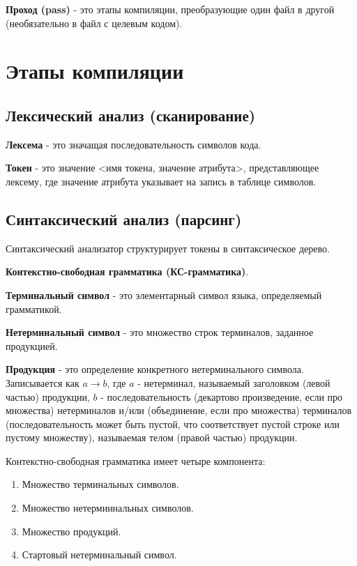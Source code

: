 \documentclass[oneside]{book}
\begin{document}
    \textbf{Проход (pass)} - это этапы компиляции,
    преобразующие один файл в другой
    (необязательно в файл с целевым кодом).
    
    \section{Этапы компиляции}
    \subsection{Лексический анализ (сканирование)}
    \textbf{Лексема} - это значащая последовательность символов кода.
    
    \textbf{Токен} - это значение <имя токена, значение атрибута>,
    представляющее лексему, где значение атрибута
    указывает на запись в таблице символов.

    \subsection{Синтаксический анализ (парсинг)}
    Синтаксический анализатор структурирует токены в синтаксическое дерево.

    \textbf{Контекстно-свободная грамматика (КС-грамматика)}.

    \textbf{Терминальный символ} - это элементарный символ языка,
    определяемый грамматикой.

    \textbf{Нетерминальный символ} - это множество строк терминалов,
    заданное продукцией.

    \textbf{Продукция} - это определение конкретного нетерминального символа.
    Записывается как $ a \rightarrow b $, где $ a $ - нетерминал, называемый заголовком
    (левой частью) продукции, $ b $ - последовательность
    (декартово произведение, если про множества)
    нетерминалов и/или (объединение, если про множества) терминалов
    (последовательность может быть пустой, что соответствует пустой строке или
    пустому множеству), называемая телом (правой частью) продукции.

    Контекстно-свободная грамматика имеет четыре компонента:
    \begin{enumerate}
        \item Множество терминальных символов.
        \item Множество нетерминнальных символов.
        \item Множество продукций.
        \item Стартовый нетерминальный символ.
    \end{enumerate}
\end{document}
